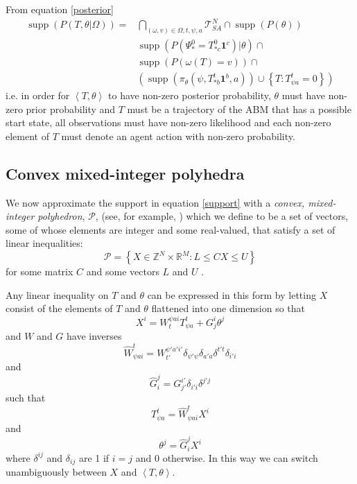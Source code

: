 \documentclass{article}
\DeclareMathOperator\supp{supp}
\begin{document}
From equation \eqref{posterior}
\begin{equation}
\begin{aligned}
\supp (P( T,\theta |\Omega)) = 
& \bigcap_{(\omega,v) \in \Omega,t, \psi, a} \mathcal{T}^N_{SA} \cap \supp(P(\theta)) \\ 
&\supp(P(\Psi^0_* = T^0_{* c}\mathbf{1}^c)|\theta) \cap \\
& \supp\left(P\left(\omega(T)=v\right)\right) \cap \\
&\left( \supp\left(\pi_\theta(\psi,T^t_{* b}\mathbf{1}^b,a)\right) \cup \left\{T:T^t_{\psi a} = 0\right\} \right)
\end{aligned}
\label{support}
\end{equation}
i.e. in order for $\left<T,\theta\right>$ to have non-zero posterior probability, $\theta$ must have non-zero prior probability and $T$ must be a trajectory of the ABM that has a possible start state, all observations must have non-zero likelihood and each non-zero element of $T$ must denote an agent action with non-zero probability.

\subsection{Convex mixed-integer polyhedra}
\label{BPoly}

We now approximate the support in equation \eqref{support} with a \textit{convex, mixed-integer polyhedron}, $\mathcal{P}$, (see, for example, \citet{conforti2010polyhedral}) which we define to be a set of vectors, some of whose elements are integer and some real-valued, that satisfy a set of linear inequalities:
\[
\mathcal{P} = \left\{ X\in\mathbb{Z}^N \times \mathbb{R}^M : L \le  CX \le U \right\}
\]
for some matrix $C$ and some vectors $L$ and $U$ .

Any linear inequality on $T$ and $\theta$ can be expressed in this form by letting $X$ consist of the elements of $T$ and $\theta$ flattened into one dimension so that
\[
X^i = W^{\psi a i}_{t}T^t_{\psi a} + G^i_j\theta^j
\]
and $W$ and $G$ have inverses
\[
\hat{W}^t_{\psi a i} = W^{\psi' a' i'}_{t'}\delta_{\psi'\psi}\delta_{a'a}\delta^{t't}\delta_{i'i}
\]
and
\[
\hat{G}^j_i = G^{i'}_{j'}\delta_{i'i}\delta^{j'j}
\]
such that
\[
T^t_{\psi a} = \hat{W}^{t}_{\psi a i}X^i
\]
and
\[
\theta^j = \hat{G}^{j}_{i} X^i
\]
where $\delta^{ij}$ and $\delta_{ij}$ are 1 if $i=j$ and 0 otherwise. In this way we can switch unambiguously between $X$ and $\left<T,\theta\right>$.
\end{document}
